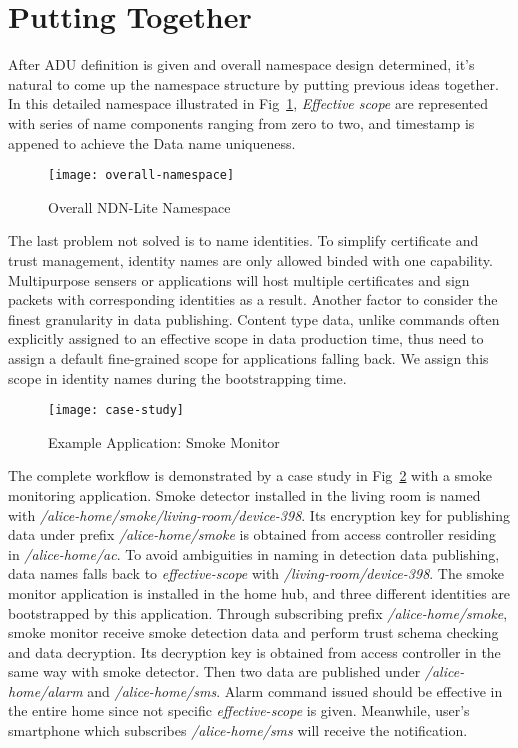 \section{Putting Together}
\label{sec:putting-together}

After ADU definition is given and overall namespace design determined, it's natural to come up the namespace structure by putting previous ideas together.
In this detailed namespace illustrated in Fig~\ref{fig:overall-namespace}, \textit{Effective scope} are represented with series of name components ranging from zero to two, and timestamp is appened to achieve the Data name uniqueness.

\begin{figure}[!h]
    \centering
    \texttt{[image: overall-namespace]}
    \caption{Overall NDN-Lite Namespace}
    \label{fig:overall-namespace}
\end{figure}

The last problem not solved is to name identities.
To simplify certificate and trust management, identity names are only allowed binded with one capability.
Multipurpose sensers or applications will host multiple certificates and sign packets with corresponding identities as a result.
Another factor to consider the finest granularity in data publishing.
Content type data, unlike commands often explicitly assigned to an effective scope in data production time, thus need to assign a default fine-grained scope for applications falling back.
We assign this scope in identity names during the bootstrapping time.

\begin{figure}[!h]
    \centering
    \texttt{[image: case-study]}
    \caption{Example Application: Smoke Monitor}
    \label{fig:case-study}
\end{figure}

The complete workflow is demonstrated by a case study in Fig~\ref{fig:case-study} with a smoke monitoring application.
Smoke detector installed in the living room is named with \textsl{/alice-home/smoke/living-room/device-398}.
Its encryption key for publishing data under prefix \textsl{/alice-home/smoke} is obtained from access controller residing in \textsl{/alice-home/ac}.
To avoid ambiguities in naming in detection data publishing, data names falls back to \textit{effective-scope} with \textsl{/living-room/device-398}.
The smoke monitor application is installed in the home hub, and three different identities are bootstrapped by this application.
Through subscribing prefix \textsl{/alice-home/smoke}, smoke monitor receive smoke detection data and perform trust schema checking and data decryption.
Its decryption key is obtained from access controller in the same way with smoke detector.
Then two data are published under \textsl{/alice-home/alarm} and \textsl{/alice-home/sms}.
Alarm command issued should be effective in the entire home since not specific \textit{effective-scope} is given.
Meanwhile, user's smartphone which subscribes \textsl{/alice-home/sms} will receive the notification.